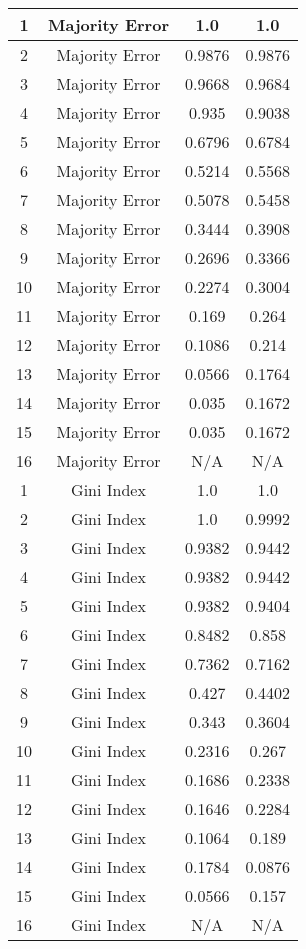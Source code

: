 \documentclass[8pt, fullpage,letterpaper]{article}
\begin{document}
\begin{enumerate}
\begin{enumerate}
\begin{center}
\begin{tabular}{c|c|c|c}
				1 & Majority Error 		& 1.0 & 1.0  \\ \hline
				2 & Majority Error 		& 0.9876 & 0.9876  \\ \hline
				3 & Majority Error 		& 0.9668 & 0.9684  \\ \hline
				4 & Majority Error		& 0.935 & 0.9038  \\ \hline
				5 & Majority Error 		& 0.6796 & 0.6784  \\ \hline
				6 & Majority Error 		& 0.5214 & 0.5568  \\ \hline
				7 & Majority Error 		& 0.5078 & 0.5458  \\ \hline
				8 & Majority Error 		& 0.3444 & 0.3908  \\ \hline
				9 & Majority Error 		& 0.2696 & 0.3366  \\ \hline
				10 & Majority Error 		& 0.2274 & 0.3004  \\ \hline
				11 & Majority Error 		& 0.169 & 0.264  \\ \hline
				12 & Majority Error 		& 0.1086 & 0.214  \\ \hline
				13 & Majority Error 		& 0.0566 & 0.1764  \\ \hline
				14 & Majority Error 		& 0.035 & 0.1672  \\ \hline
				15 & Majority Error 		& 0.035 & 0.1672  \\ \hline
				16 & Majority Error 		& N/A & N/A  \\ \hline\hline

				1 & Gini Index 			& 1.0 & 1.0  \\ \hline
				2 & Gini Index 			& 1.0 & 0.9992  \\ \hline
				3 & Gini Index 			& 0.9382 & 0.9442  \\ \hline
				4 & Gini Index 			& 0.9382 & 0.9442  \\ \hline
				5 & Gini Index 			& 0.9382 & 0.9404  \\ \hline
				6 & Gini Index 			& 0.8482 & 0.858  \\ \hline
				7 & Gini Index 			& 0.7362 & 0.7162  \\ \hline
				8 & Gini Index 			& 0.427 & 0.4402  \\ \hline
				9 & Gini Index 			& 0.343 & 0.3604  \\ \hline
				10 & Gini Index 			& 0.2316 & 0.267  \\ \hline
				11 & Gini Index 			& 0.1686 & 0.2338  \\ \hline
				12 & Gini Index 			& 0.1646 & 0.2284  \\ \hline
				13 & Gini Index 			& 0.1064 & 0.189  \\ \hline
				14 & Gini Index 			& 0.1784 & 0.0876  \\ \hline
				15 & Gini Index 			& 0.0566 & 0.157  \\ \hline
				16 & Gini Index 			& N/A & N/A  \\ \hline\hline


\end{tabular}
\end{center}
\end{enumerate}
\end{enumerate}
\end{document}
